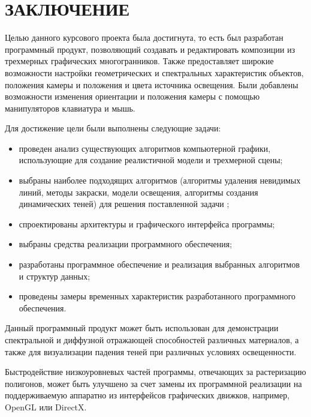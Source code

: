 \section*{\centering ЗАКЛЮЧЕНИЕ}

Целью данного курсового проекта была достигнута, то есть был разработан программный продукт, позволяющий создавать и редактировать композиции из трехмерных графических многогранников. Также предоставляет широкие возможности настройки геометрических и спектральных характеристик объектов, положения камеры и положения и цвета источника освещения. Были добавлены возможности изменения ориентации и положения камеры с помощью манипуляторов клавиатура и мышь.

Для достижение цели были выполнены следующие задачи:
\begin{itemize}
	\item проведен анализ существующих алгоритмов компьютерной графики, использующие для создание реалистичной модели и трехмерной сцены;
	\item выбраны наиболее подходящих алгоритмов (алгоритмы удаления невидимых линий, методы закраски, модели освещения, алгоритмы создания динамических теней) для решения поставленной задачи ;
	\item спроектированы архитектуры и графического интерфейса программы;
	\item выбраны средства реализации программного обеспечения;
	\item разработаны программное обеспечение и реализация выбранных алгоритмов и структур данных;
	\item проведены замеры временных характеристик разработанного программного обеспечения.  
\end{itemize}

Данный программный продукт может быть использован для демонстрации спектральной и диффузной отражающей способностей различных материалов, а также для визуализации падения теней при различных условиях освещенности. 

Быстродействие низкоуровневых частей программы, отвечающих за растеризацию полигонов, может быть улучшено за счет замены их программной реализации на поддерживаемую аппаратно из интерфейсов графических движков, например, OpenGL или DirectX.

